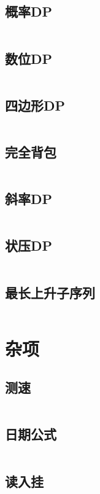 \documentclass[UTF8]{ctexart}
\begin{document}
\subsection{概率DP}
\inputminted{cpp}{dp/概率dp.cpp}

\subsection{数位DP}
\inputminted{cpp}{dp/数位dp.cpp}

\subsection{四边形DP}
\inputminted{cpp}{dp/四边形dp.cpp}

\subsection{完全背包}
\inputminted{cpp}{dp/完全背包.cpp}

\subsection{斜率DP}
\inputminted{cpp}{dp/斜率dp.cpp}

\subsection{状压DP}
\inputminted{cpp}{dp/状压dp.cpp}

\subsection{最长上升子序列}
\inputminted{cpp}{dp/最长上升子序列.cpp}

\section{杂项}

\subsection{测速}
\inputminted{cpp}{others/chrono.cpp}

\subsection{日期公式}
\inputminted{cpp}{others/date.cpp}

\subsection{读入挂}
\inputminted{cpp}{others/fread.cpp}
\end{document}
